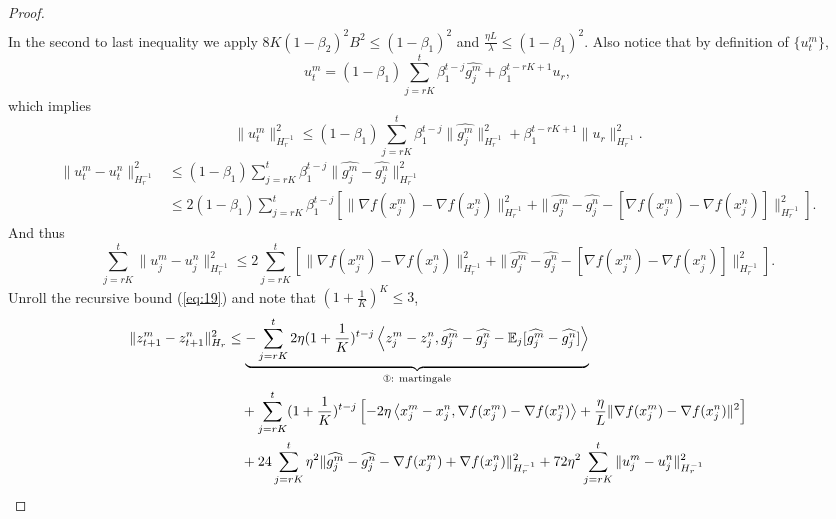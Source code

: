 \documentclass{article} %
\numberwithin{equation}{section}
\newcommand{\cirone}{\text{\ding{172}}}
\renewcommand{\eqref}[1]{(\ref{#1})}
\begin{document}
\begin{proof}
\begin{equation}
\begin{aligned}
        \end{aligned}
    \end{equation}
    In the second to last inequality we apply $8K(1-\beta_2)^2B^2\leq (1-\beta_1)^2$ and $\frac{\eta L}{\lambda}\leq (1-\beta_1)^2$.
    Also notice that by definition of $\{u_t^m\}$, 
    \begin{equation}
        u_t^m=(1-\beta_1)\sum_{j=rK}^t \beta_1^{t-j}\widehat{g_j^m}+\beta_1^{t-rK+1}u_r,
    \end{equation}
    which implies
    \begin{equation}
        \|u_t^m\|_{H_r^{-1}}^2\leq (1-\beta_1)\sum_{j=rK}^t \beta_1^{t-j}\|\widehat{g_j^m}\|_{H_r^{-1}}^2+\beta_1^{t-rK+1}\|u_r\|_{H_r^{-1}}^2.
    \end{equation}
    \begin{equation}\label{eq:3}
        \begin{aligned}
            \|u_t^m-u_t^n\|_{H_r^{-1}}^2
            &\leq (1-\beta_1)\sum_{j=rK}^t \beta_1^{t-j} \|\widehat{g_j^m}-\widehat{g_j^n}\|_{H_r^{-1}}^2 \\
            &\leq 2(1-\beta_1)\sum_{j=rK}^t \beta_1^{t-j} \left[\|\nabla f(x_j^m)-\nabla f(x_j^n)\|_{H_r^{-1}}^2 + \|\widehat{g_j^m}-\widehat{g_j^n}-[\nabla f(x_j^m)-\nabla f(x_j^n)]\|_{H_r^{-1}}^2\right].
        \end{aligned}
    \end{equation}
    And thus 
    \begin{equation}\label{eq:20}
        \sum_{j=rK}^t\|u_j^m-u_j^n\|_{H_r^{-1}}^2\leq 2\sum_{j=rK}^t\left[\|\nabla f(x_j^m)-\nabla f(x_j^n)\|_{H_r^{-1}}^2 + \|\widehat{g_j^m}-\widehat{g_j^n}-[\nabla f(x_j^m)-\nabla f(x_j^n)]\|_{H_r^{-1}}^2\right].
    \end{equation}
    Unroll the recursive bound \eqref{eq:19} and note that $(1+\frac{1}{K})^K\leq 3$,
    \begin{equation}
        \begin{aligned}
            \|z_{t+1}^m-z_{t+1}^n\|_{H_r}^2 
            &\leq \underbrace{-\sum_{j=rK}^{t} 2\eta(1+\frac{1}{K})^{t-j} \left\langle z_j^m-z_j^n, \widehat{g_j^m}-\widehat{g_j^n}-\expect_j[\widehat{g_j^m}-\widehat{g_j^n}] \right\rangle}_{\cirone\text{: martingale}} \\
            &\quad + \sum_{j=rK}^{t} (1+\frac{1}{K})^{t-j}\left[- 2\eta \left\langle x_j^m-x_j^n, \nabla f(x_j^m)-\nabla f(x_j^n)\right\rangle + \frac{\eta}{L} \|\nabla f(x_j^m)-\nabla f(x_j^n)\|^2\right] \\
            &\quad + 24\sum_{j=rK}^{t}\eta^2\|\widehat{g_j^m}-\widehat{g_j^n}-\nabla f(x_j^m)+\nabla f(x_j^n)\|_{H_r^{-1}}^2 + 72\eta^2\sum_{j=rK}^{t} \|u_j^m-u_j^n \|_{H_r^{-1}}^2 \\

\end{aligned}
\end{equation}
\end{proof}
\end{document}
